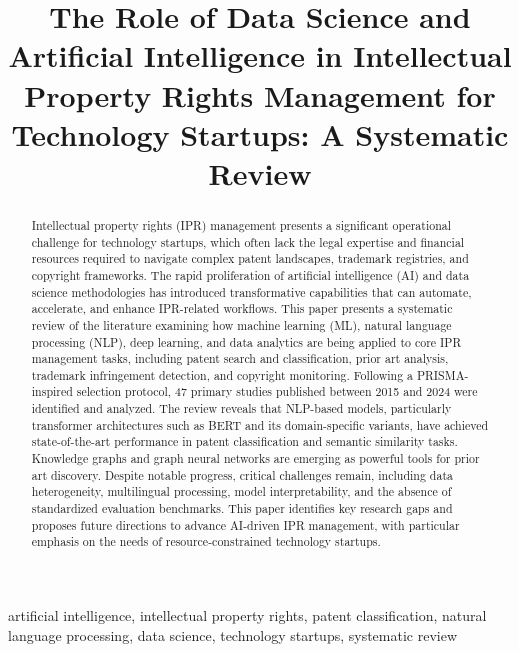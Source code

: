 \documentclass[conference]{IEEEtran}
\begin{document}
\title{The Role of Data Science and Artificial Intelligence in Intellectual Property Rights Management for Technology Startups: A Systematic Review}

\author{
}

\maketitle

\begin{abstract}
Intellectual property rights (IPR) management presents a significant operational challenge for technology startups, which often lack the legal expertise and financial resources required to navigate complex patent landscapes, trademark registries, and copyright frameworks. The rapid proliferation of artificial intelligence (AI) and data science methodologies has introduced transformative capabilities that can automate, accelerate, and enhance IPR-related workflows. This paper presents a systematic review of the literature examining how machine learning (ML), natural language processing (NLP), deep learning, and data analytics are being applied to core IPR management tasks, including patent search and classification, prior art analysis, trademark infringement detection, and copyright monitoring. Following a PRISMA-inspired selection protocol, 47 primary studies published between 2015 and 2024 were identified and analyzed. The review reveals that NLP-based models, particularly transformer architectures such as BERT and its domain-specific variants, have achieved state-of-the-art performance in patent classification and semantic similarity tasks. Knowledge graphs and graph neural networks are emerging as powerful tools for prior art discovery. Despite notable progress, critical challenges remain, including data heterogeneity, multilingual processing, model interpretability, and the absence of standardized evaluation benchmarks. This paper identifies key research gaps and proposes future directions to advance AI-driven IPR management, with particular emphasis on the needs of resource-constrained technology startups.
\end{abstract}

\begin{IEEEkeywords}
artificial intelligence, intellectual property rights, patent classification, natural language processing, data science, technology startups, systematic review
\end{IEEEkeywords}
\end{document}
